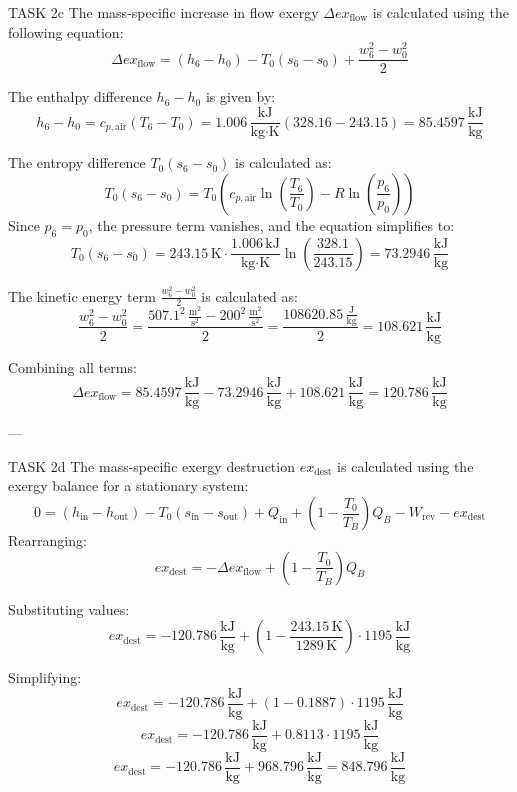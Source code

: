 TASK 2c  
The mass-specific increase in flow exergy \( \Delta ex_{\text{flow}} \) is calculated using the following equation:  
\[
\Delta ex_{\text{flow}} = (h_6 - h_0) - T_0 (s_6 - s_0) + \frac{w_6^2 - w_0^2}{2}
\]

The enthalpy difference \( h_6 - h_0 \) is given by:  
\[
h_6 - h_0 = c_{p,\text{air}} (T_6 - T_0) = 1.006 \, \frac{\text{kJ}}{\text{kg·K}} (328.16 - 243.15) = 85.4597 \, \frac{\text{kJ}}{\text{kg}}
\]

The entropy difference \( T_0 (s_6 - s_0) \) is calculated as:  
\[
T_0 (s_6 - s_0) = T_0 \left( c_{p,\text{air}} \ln \left( \frac{T_6}{T_0} \right) - R \ln \left( \frac{p_6}{p_0} \right) \right)
\]
Since \( p_6 = p_0 \), the pressure term vanishes, and the equation simplifies to:  
\[
T_0 (s_6 - s_0) = 243.15 \, \text{K} \cdot \frac{1.006 \, \text{kJ}}{\text{kg·K}} \ln \left( \frac{328.1}{243.15} \right) = 73.2946 \, \frac{\text{kJ}}{\text{kg}}
\]

The kinetic energy term \( \frac{w_6^2 - w_0^2}{2} \) is calculated as:  
\[
\frac{w_6^2 - w_0^2}{2} = \frac{507.1^2 \, \frac{\text{m}^2}{\text{s}^2} - 200^2 \, \frac{\text{m}^2}{\text{s}^2}}{2} = \frac{108620.85 \, \frac{\text{J}}{\text{kg}}}{2} = 108.621 \, \frac{\text{kJ}}{\text{kg}}
\]

Combining all terms:  
\[
\Delta ex_{\text{flow}} = 85.4597 \, \frac{\text{kJ}}{\text{kg}} - 73.2946 \, \frac{\text{kJ}}{\text{kg}} + 108.621 \, \frac{\text{kJ}}{\text{kg}} = 120.786 \, \frac{\text{kJ}}{\text{kg}}
\]

---

TASK 2d  
The mass-specific exergy destruction \( ex_{\text{dest}} \) is calculated using the exergy balance for a stationary system:  
\[
0 = (h_{\text{in}} - h_{\text{out}}) - T_0 (s_{\text{in}} - s_{\text{out}}) + Q_{\text{in}} + \left( 1 - \frac{T_0}{T_B} \right) Q_B - W_{\text{rev}} - ex_{\text{dest}}
\]
Rearranging:  
\[
ex_{\text{dest}} = -\Delta ex_{\text{flow}} + \left( 1 - \frac{T_0}{T_B} \right) Q_B
\]

Substituting values:  
\[
ex_{\text{dest}} = -120.786 \, \frac{\text{kJ}}{\text{kg}} + \left( 1 - \frac{243.15 \, \text{K}}{1289 \, \text{K}} \right) \cdot 1195 \, \frac{\text{kJ}}{\text{kg}}
\]

Simplifying:  
\[
ex_{\text{dest}} = -120.786 \, \frac{\text{kJ}}{\text{kg}} + \left( 1 - 0.1887 \right) \cdot 1195 \, \frac{\text{kJ}}{\text{kg}}
\]
\[
ex_{\text{dest}} = -120.786 \, \frac{\text{kJ}}{\text{kg}} + 0.8113 \cdot 1195 \, \frac{\text{kJ}}{\text{kg}}
\]
\[
ex_{\text{dest}} = -120.786 \, \frac{\text{kJ}}{\text{kg}} + 968.796 \, \frac{\text{kJ}}{\text{kg}} = 848.796 \, \frac{\text{kJ}}{\text{kg}}
\]